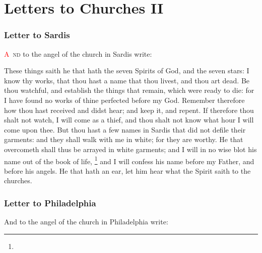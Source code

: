 \chapter{Letters to Churches II}
\subsection*{Letter to Sardis}
\lettrine[lines=3]{\textcolor{red}{A}}{\ nd} to the angel of the church in Sardis write:

\zz These things saith he that hath the seven Spirits of God, and the seven stars: I know thy works, that thou hast a name that thou livest, and thou art dead. %
Be thou watchful, and establish the things that remain, which were ready to die: for I have found no works of thine perfected before my God. %
Remember therefore how thou hast received and didst hear; and keep it, and repent. If therefore thou shalt not watch, I will come as a thief, and thou shalt not know what hour I will come upon thee. %
But thou hast a few names in Sardis that did not defile their garments: and they shall walk with me in white; for they are worthy. %
He that overcometh shall thus be arrayed in white garments; and I will in no wise blot his name out of the book of life,%
	\footnote{ %
			}
 and I will confess his name before my Father, and before his angels. %
He that hath an ear, let him hear what the Spirit saith to the churches.
\subsection*{Letter to Philadelphia}
And to the angel of the church in Philadelphia write:

